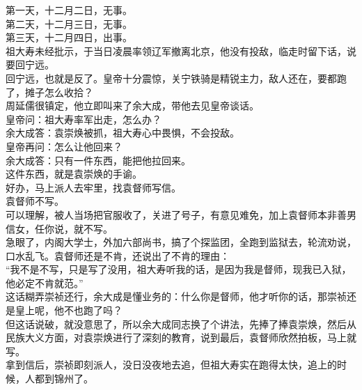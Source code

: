 \begin{multicols}{\theparacolNo}
第一天，十二月二日，无事。\\

第二天，十二月三日，无事。\\

第三天，十二月四日，出事。\\

祖大寿未经批示，于当日凌晨率领辽军撤离北京，他没有投敌，临走时留下话，说要回宁远。\\

回宁远，也就是反了。皇帝十分震惊，关宁铁骑是精锐主力，敌人还在，要都跑了，摊子怎么收拾？\\

周延儒很镇定，他立即叫来了余大成，带他去见皇帝谈话。\\

皇帝问：祖大寿率军出走，怎么办？\\

余大成答：袁崇焕被抓，祖大寿心中畏惧，不会投敌。\\

皇帝再问：怎么让他回来？\\

余大成答：只有一件东西，能把他拉回来。\\

这件东西，就是袁崇焕的手谕。\\

好办，马上派人去牢里，找袁督师写信。\\

袁督师不写。\\

可以理解，被人当场把官服收了，关进了号子，有意见难免，加上袁督师本非善男信女，任你说，就不写。\\

急眼了，内阁大学士，外加六部尚书，搞了个探监团，全跑到监狱去，轮流劝说，口水乱飞。袁督师还是不肯，还说出了不肯的理由：\\

“我不是不写，只是写了没用，祖大寿听我的话，是因为我是督师，现我已入狱，他必定不肯就范。”\\

这话糊弄崇祯还行，余大成是懂业务的：什么你是督师，他才听你的话，那崇祯还是皇上呢，他不也跑了吗？\\

但这话说破，就没意思了，所以余大成同志换了个讲法，先捧了捧袁崇焕，然后从民族大义方面，对袁崇焕进行了深刻的教育，说到最后，袁督师欣然拍板，马上就写。\\

拿到信后，崇祯即刻派人，没日没夜地去追，但祖大寿实在跑得太快，追上的时候，人都到锦州了。\\


\end{multicols}

